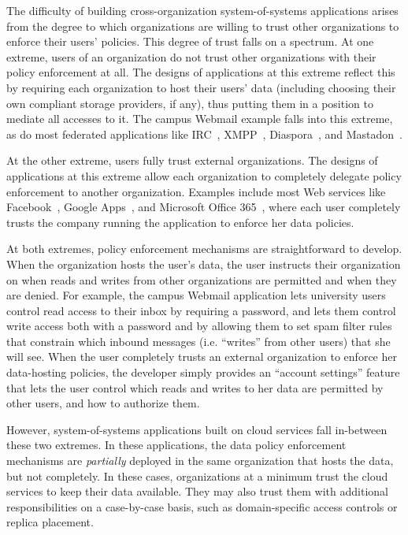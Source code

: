 The difficulty of building cross-organization system-of-systems applications arises from the
degree to which organizations are willing to trust other organizations to enforce
their users' policies.  This degree of trust falls on a spectrum.
At one extreme, users of an organization do not trust other organizations with
their policy enforcement at all.  The designs of applications at this extreme reflect this by requiring
each organization to host their users' data (including choosing their own compliant storage
providers, if any), thus putting them in a position to
mediate all accesses to it.
The campus Webmail example falls into this extreme, as do most federated
applications like IRC~\cite{irc}, XMPP~\cite{xmpp},
Diaspora~\cite{diaspora}, and Mastadon~\cite{mastadon}.

At the other extreme,
users fully trust external organizations.
The designs of applications at this extreme allow each organization to completely delegate
policy enforcement to another organization.  Examples include most Web services like 
Facebook~\cite{facebook}, Google Apps~\cite{gapps}, and Microsoft
Office 365~\cite{microsoft-apps}, where each user completely trusts the company running
the application to enforce her data policies.

At both extremes, policy enforcement mechanisms are
straightforward to develop.  When the organization hosts the user's data, the user 
instructs their organization on when reads and writes from other
organizations are permitted and when they are denied.
For example, the campus Webmail application lets university users
control read access to their inbox by requiring a password, and lets
them control write access both with a password and by allowing them to
set spam filter rules that constrain which inbound messages
(i.e. ``writes'' from other users) that she will
see.  When the user completely trusts an external organization to enforce her
data-hosting policies, the developer simply provides an ``account settings''
feature that lets the user control which reads and writes to her data are
permitted by other users, and how to authorize them.

However, system-of-systems applications built on cloud services
fall in-between these two extremes.  In these applications, the data policy
enforcement mechanisms are \emph{partially} deployed in the same
organization that hosts the data, but not completely.  In these cases,
organizations at a minimum trust the cloud services to keep their data available.
They may also trust them with additional
responsibilities on a case-by-case basis,
such as domain-specific access controls or replica placement.

